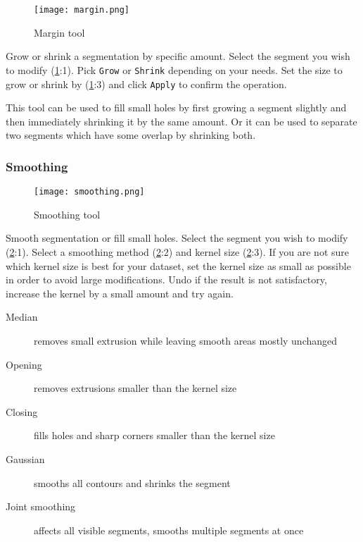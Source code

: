 \begin{figure}[h!]
	\centerline{
		\texttt{[image: margin.png]}}
	\caption{Margin tool}\label{fig:margin}
\end{figure}
\noindent
Grow or shrink a segmentation by specific amount.
Select the segment you wish to modify (\cref{fig:margin}:1).
Pick \texttt{Grow} or \texttt{Shrink} depending on your needs.
Set the size to grow or shrink by (\cref{fig:margin}:3) and click \texttt{Apply} to confirm the operation.
\newline %
\newline %
\begin{minipage}{0.4\textwidth}
	\begin{center}
		
	\end{center}
\end{minipage}%
%
\begin{minipage}{0.5\textwidth}
	This tool can be used to fill small holes by first growing a segment slightly and then immediately shrinking it by the same amount.
	Or it can be used to separate two segments which have some overlap by shrinking both.
\end{minipage}
\pagebreak

\subsubsection{Smoothing}
\begin{figure}[h]
	\begin{subfigure}{0.2\textwidth}
		
	\end{subfigure}
\end{figure}


\begin{figure}[h!]
	\centerline{
		\texttt{[image: smoothing.png]}}
	\caption{Smoothing tool}\label{fig:smoothing}
\end{figure}
\noindent
Smooth segmentation or fill small holes.
Select the segment you wish to modify (\cref{fig:smoothing}:1).
Select a smoothing method (\cref{fig:smoothing}:2) and kernel size (\cref{fig:smoothing}:3). If you are not sure which kernel size is best for your dataset, set the kernel size as small as possible in order to avoid large modifications.
Undo if the result is not satisfactory, increase the kernel by a small amount and try again.
\begin{description}
	\item [Median] removes small extrusion while leaving smooth areas mostly unchanged
	\item [Opening] removes extrusions smaller than the kernel size
	\item [Closing] fills holes and sharp corners smaller than the kernel size
	\item [Gaussian] smooths all contours and shrinks the segment
	\item [Joint smoothing] affects all visible segments, smooths multiple segments at once
\end{description}

